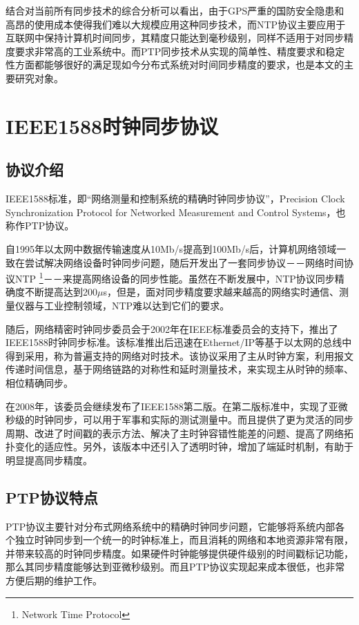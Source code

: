 结合对当前所有同步技术的综合分析可以看出，由于GPS严重的国防安全隐患和高昂的使用成本使得我们难以大规模应用这种同步技术，而NTP协议主要应用于互联网中保持计算机时间同步，其精度只能达到毫秒级别，同样不适用于对同步精度要求非常高的工业系统中。而PTP同步技术从实现的简单性、精度要求和稳定性方面都能够很好的满足现如今分布式系统对时间同步精度的要求，也是本文的主要研究对象。


\section{IEEE1588时钟同步协议}

\subsection{协议介绍}
\label{sec:1588_intro}
IEEE1588标准，即“网络测量和控制系统的精确时钟同步协议”，Precision Clock Synchronization Protocol for Networked Measurement and Control Systems，也称作PTP协议。

自1995年以太网中数据传输速度从10Mb/s提高到100Mb/s后，计算机网络领域一致在尝试解决网络设备时钟同步问题，随后开发出了一套同步协议－－网络时间协议NTP \footnote{Network Time Protocol}－－来提高网络设备的同步性能。虽然在不断发展中，NTP协议同步精确度不断提高达到200$\mu$s，但是，面对同步精度要求越来越高的网络实时通信、测量仪器与工业控制领域，NTP难以达到它们的要求。

随后，网络精密时钟同步委员会于2002年在IEEE标准委员会的支持下，推出了IEEE1588时钟同步标准。该标准推出后迅速在Ethernet/IP等基于以太网的总线中得到采用，称为普遍支持的网络对时技术。该协议采用了主从时钟方案，利用报文传递时间信息，基于网络链路的对称性和延时测量技术，来实现主从时钟的频率、相位精确同步。

在2008年，该委员会继续发布了IEEE1588第二版。在第二版标准中，实现了亚微秒级的时钟同步，可以用于军事和实际的测试测量中。而且提供了更为灵活的同步周期、改进了时间戳的表示方法、解决了主时钟容错性能差的问题、提高了网络拓扑变化的适应性。另外，该版本中还引入了透明时钟，增加了端延时机制，有助于明显提高同步精度。

\subsection{PTP协议特点}
\label{sec:1588_features}
PTP协议主要针对分布式网络系统中的精确时钟同步问题，它能够将系统内部各个独立时钟同步到一个统一的时钟标准上，而且消耗的网络和本地资源非常有限，并带来较高的时钟同步精度。如果硬件时钟能够提供硬件级别的时间戳标记功能，那么其同步精度能够达到亚微秒级别。而且PTP协议实现起来成本很低，也非常方便后期的维护工作。

